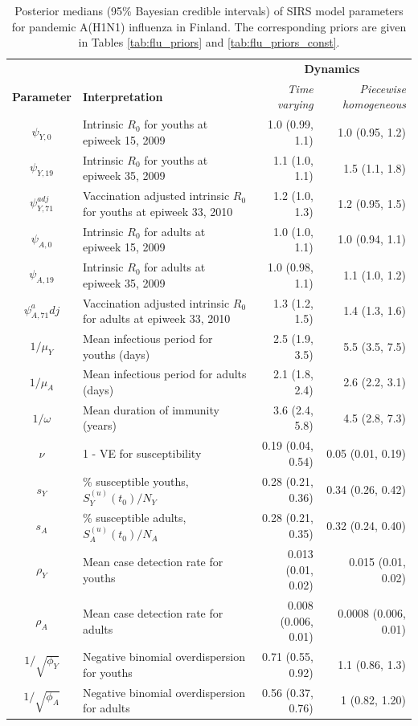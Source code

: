 \begin{table}
	\caption[Posterior estimates of SIRS model parameters for pandemic A(H1N1) influenza in Finland.]{Posterior medians (95\% Bayesian credible intervals) of SIRS model parameters for pandemic A(H1N1) influenza in Finland. The corresponding priors are given in Tables \ref{tab:flu_priors} and \ref{tab:flu_priors_const}.} 
	\label{tab:flu_param_ests}
	\centering\footnotesize
	\begin{tabular}{clrr}
		\hline
		&&\multicolumn{2}{c}{\textbf{Dynamics}}\\
		\cmidrule{3-4}\textbf{Parameter} & \textbf{Interpretation} & \textit{Time varying} & \textit{Piecewise homogeneous}\\
		\hline
		$ \psi_{Y,0} $ & Intrinsic $ R_0 $ for youths at epiweek 15, 2009  & 1.0 (0.99, 1.1) & 1.0 (0.95, 1.2)\\
		$ \psi_{Y,19} $ & Intrinsic $ R_0 $ for youths at epiweek 35, 2009 & 1.1 (1.0, 1.1) & 1.5 (1.1, 1.8)\\
		$ \psi_{Y,71}^{adj} $ & Vaccination adjusted intrinsic $ R_0 $ for youths at epiweek 33, 2010 & 1.2 (1.0, 1.3) & 1.2 (0.95, 1.5)\\
		$ \psi_{A,0} $ & Intrinsic $ R_0 $ for adults at epiweek 15, 2009  & 1.0 (1.0, 1.1) & 1.0 (0.94, 1.1)\\
		$ \psi_{A,19} $ & Intrinsic $ R_0 $ for adults at epiweek 35, 2009 & 1.0 (0.98, 1.1) & 1.1 (1.0, 1.2)\\
		$ \psi_{A,71}^adj $ & Vaccination adjusted intrinsic $ R_0 $ for adults at epiweek 33, 2010 & 1.3 (1.2, 1.5) & 1.4 (1.3, 1.6)\\
		$ 1/\mu_{Y} $ & Mean infectious period for youths (days) & 2.5 (1.9, 3.5) & 5.5 (3.5, 7.5)\\
		$ 1/\mu_A $ & Mean infectious period for adults (days) & 2.1 (1.8, 2.4) & 2.6 (2.2, 3.1)\\
		$ 1/\omega $ & Mean duration of immunity (years) & 3.6 (2.4, 5.8) & 4.5 (2.8, 7.3)\\
		$ \nu $ & 1 - VE for susceptibility & 0.19 (0.04, 0.54) & 0.05 (0.01, 0.19)\\
		$ s_Y $ & \% susceptible youths, $ S^{(u)}_Y(t_0) / N_Y $ & 0.28 (0.21, 0.36) & 0.34 (0.26, 0.42) \\
		$ s_A $ & \% susceptible adults, $ S_A^{(u)}(t_0) / N_A $ & 0.28 (0.21, 0.35) & 0.32 (0.24, 0.40) \\
		$ \rho_Y $ & Mean case detection rate for youths & 0.013 (0.01, 0.02) & 0.015 (0.01, 0.02)\\
		$ \rho_A $ & Mean case detection rate for adults & 0.008 (0.006, 0.01) & 0.0008 (0.006, 0.01)\\		
		$ 1/\sqrt{\phi_Y} $ & Negative binomial overdispersion for youths & 0.71 (0.55, 0.92) & 1.1 (0.86, 1.3)\\
		$ 1/\sqrt{\phi_A} $ & Negative binomial overdispersion for adults & 0.56 (0.37, 0.76) & 1 (0.82, 1.20)\\
		\hline
	\end{tabular}
\end{table}

